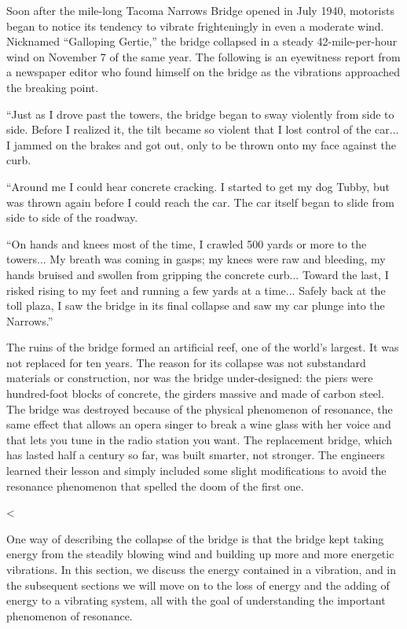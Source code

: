 Soon after the mile-long Tacoma Narrows Bridge opened in
July 1940, motorists began to notice its tendency to vibrate
frighteningly in even a moderate wind. Nicknamed ``Galloping
Gertie,'' the bridge collapsed in a steady 42-mile-per-hour
wind on November 7 of the same year. The following is an
eyewitness report from a newspaper editor who found himself
on the bridge as the vibrations approached the breaking point.

``Just as I drove past the towers, the bridge began to sway
violently from side to side. Before I realized it, the tilt
became so violent that I lost control of the car... I jammed
on the brakes and got out, only to be thrown onto my
face against the curb.

``Around me I could hear concrete cracking. I started to get
my dog Tubby, but was thrown again before I could reach the
car. The car itself began to slide from side to side of the roadway.

``On hands and knees most of the time, I crawled 500 yards
or more to the towers... My breath was coming in gasps; my
knees were raw and bleeding, my hands bruised and swollen
from gripping the concrete curb... Toward the last, I risked
rising to my feet and running a few yards at a time...
Safely back at the toll plaza, I saw the bridge in its final
collapse and saw my car plunge into the Narrows.''

The ruins of the bridge formed an artificial reef, one of
the world's largest. It was not replaced for ten years. The
reason for its collapse was not substandard materials or
construction, nor was the bridge under-designed: the piers
were hundred-foot blocks of concrete, the girders massive
and made of carbon steel. The bridge was destroyed because
of the physical phenomenon of resonance, the same effect
that allows an opera singer to break a wine glass with her
voice and that lets you tune in the radio station you want.
The replacement bridge, which has lasted half a century so
far, was built smarter, not stronger. The engineers learned
their lesson and simply included some slight modifications
to avoid the resonance phenomenon that spelled the
doom of the first one.

<%

One way of describing the collapse of the bridge is that the
bridge kept taking energy from the steadily blowing wind and
building up more and more energetic vibrations. In this
section, we discuss the energy contained in a vibration, and
in the subsequent sections we will move on to the loss of
energy and the adding of energy to a vibrating system, all
with the goal of understanding the important phenomenon of resonance.

